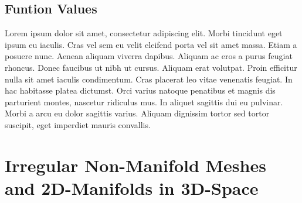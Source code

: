 \documentclass[openany]{book}
\begin{document}
\subsection{Funtion Values}
Lorem ipsum dolor sit amet, consectetur adipiscing elit. Morbi tincidunt eget 
ipsum eu iaculis. Cras vel sem eu velit eleifend porta vel sit amet massa. Etiam 
a posuere nunc. Aenean aliquam viverra dapibus. Aliquam ac eros a purus feugiat 
rhoncus. Donec faucibus ut nibh ut cursus. Aliquam erat volutpat. Proin efficitur 
nulla sit amet iaculis condimentum. Cras placerat leo vitae venenatis feugiat. In 
hac habitasse platea dictumst. Orci varius natoque penatibus et magnis dis 
parturient montes, nascetur ridiculus mus. In aliquet sagittis dui eu pulvinar. 
Morbi a arcu eu dolor sagittis varius. Aliquam dignissim tortor sed tortor 
suscipit, eget imperdiet mauris convallis.~\cite[p.~00]{SourceNeeded}


\section{Irregular Non-Manifold Meshes and 2D-Manifolds in 3D-Space}
\end{document}
